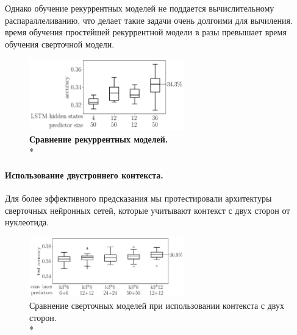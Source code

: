 Однако обучение рекуррентных моделей не поддается вычислительному распараллеливанию, что делает такие задачи очень долгоими для вычиления. время обучения простейшей рекуррентной модели в разы превышает время обучения сверточной модели.  

\begin{figure}[H] %
	\centering
	\includegraphics[width = 0.6\textwidth]{pics/rnn_models_all_runs_p1_ecoli_100000_10000_50_0.png}
	\caption{{\bfseries Сравнение рекуррентных моделей.} \\* 
		   \mannwhitni }
	\label{fig:rnn_test}	
\end{figure}

\paragraph{Использование двустроннего контекста.} Для более эффективного предсказания мы протестировали архитектуры сверточных нейронных сетей, которые учитывают контекст с двух сторон от нуклеотида. 

\begin{figure}[H] %
	\centering
	\includegraphics[width = 0.6\textwidth]{pics/cnn_models_two_sided.png}
	\caption{{\bfseries} Сравнение сверточных моделей при использовании контекста с двух сторон.\\* }
	\label{fig:cnn_twosided}	
\end{figure}
	